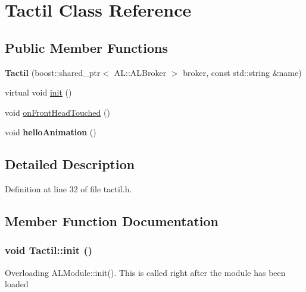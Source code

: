 \hypertarget{class_tactil}{
\section{Tactil Class Reference}
\label{class_tactil}
}
\subsection*{Public Member Functions}
\begin{DoxyCompactItemize}
\item 
\hypertarget{class_tactil_ad1857b0f5ee77f6d3ed16a9c8ec9a5f2}{
{\bfseries Tactil} (boost::shared\_\-ptr$<$ AL::ALBroker $>$ broker, const std::string \&name)}
\label{class_tactil_ad1857b0f5ee77f6d3ed16a9c8ec9a5f2}

\item 
virtual void \hyperlink{class_tactil_a5bb2ef34e589f75be9f123599bd804b4}{init} ()
\item 
void \hyperlink{class_tactil_a92426208e117a01774b735a0d034c45c}{onFrontHeadTouched} ()
\item 
\hypertarget{class_tactil_a0a31ee1e91f4c8a50010a5a9a7673758}{
void {\bfseries helloAnimation} ()}
\label{class_tactil_a0a31ee1e91f4c8a50010a5a9a7673758}

\end{DoxyCompactItemize}


\subsection{Detailed Description}


Definition at line 32 of file tactil.h.



\subsection{Member Function Documentation}
\hypertarget{class_tactil_a5bb2ef34e589f75be9f123599bd804b4}{
\subsubsection[{init}]{\setlength{\rightskip}{0pt plus 5cm}void Tactil::init ()}}
\label{class_tactil_a5bb2ef34e589f75be9f123599bd804b4}
Overloading ALModule::init(). This is called right after the module has been loaded 

